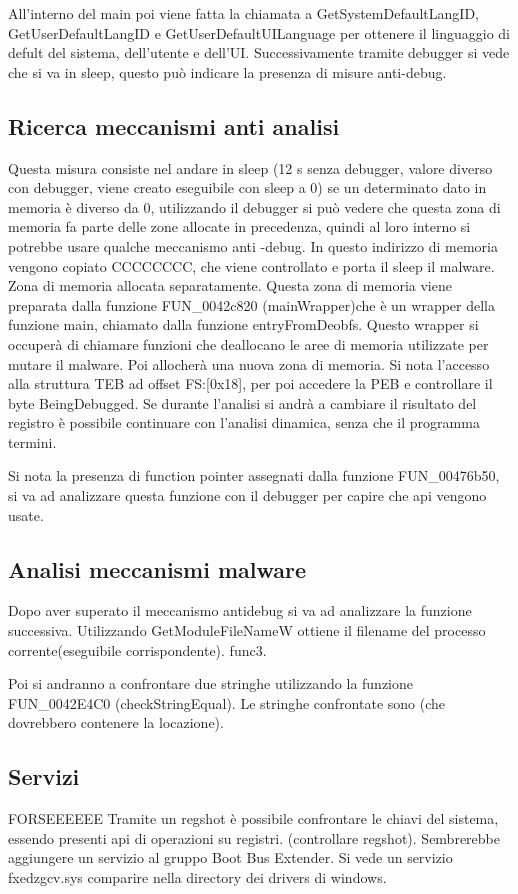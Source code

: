 \documentclass[]{article}
\begin{document}
All'interno del main poi viene fatta la chiamata a GetSystemDefaultLangID, GetUserDefaultLangID e GetUserDefaultUILanguage per ottenere il linguaggio di defult del sistema, dell'utente e dell'UI. Successivamente tramite debugger si vede che si va in sleep, questo può indicare la presenza di misure anti-debug. 

\subsection{Ricerca meccanismi anti analisi}
Questa misura consiste nel andare in sleep (12 s senza debugger, valore diverso con debugger, viene creato eseguibile con sleep a 0) se un determinato dato in memoria è diverso da 0, utilizzando il debugger si può vedere che questa zona di memoria fa parte delle zone allocate in precedenza, quindi al loro interno si potrebbe usare qualche meccanismo anti -debug. In questo indirizzo di memoria vengono copiato CCCCCCCC, che viene controllato e porta il sleep il malware.  Zona di memoria allocata separatamente. Questa zona di memoria viene preparata dalla funzione FUN\_0042c820 (mainWrapper)che è un wrapper della funzione main, chiamato dalla funzione entryFromDeobfs.  Questo wrapper si occuperà di chiamare funzioni che deallocano le aree di memoria utilizzate per mutare il malware. Poi allocherà una nuova zona di memoria. Si nota l'accesso alla struttura TEB ad offset FS:[0x18], per poi accedere la PEB e controllare il byte BeingDebugged. Se durante l'analisi si andrà a cambiare il risultato del registro è possibile continuare con l'analisi dinamica, senza che il programma termini.


Si nota la presenza di function pointer assegnati dalla funzione FUN\_00476b50, si va ad analizzare questa funzione con il debugger per capire che api vengono usate. 


\subsection{Analisi meccanismi malware}
Dopo aver superato il meccanismo antidebug si va ad analizzare la funzione successiva. Utilizzando GetModuleFileNameW ottiene il filename del processo corrente(eseguibile corrispondente). func3.

Poi si andranno a confrontare due stringhe utilizzando la funzione FUN\_0042E4C0 (checkStringEqual). Le stringhe confrontate sono (che dovrebbero contenere la locazione). 

\subsection{Servizi} FORSEEEEEE
Tramite un regshot è possibile confrontare le chiavi del sistema, essendo presenti api di operazioni su registri. (controllare regshot). Sembrerebbe aggiungere un servizio al gruppo Boot Bus Extender. Si vede un servizio fxedzgcv.sys comparire nella directory dei drivers di windows. 
\end{document}
